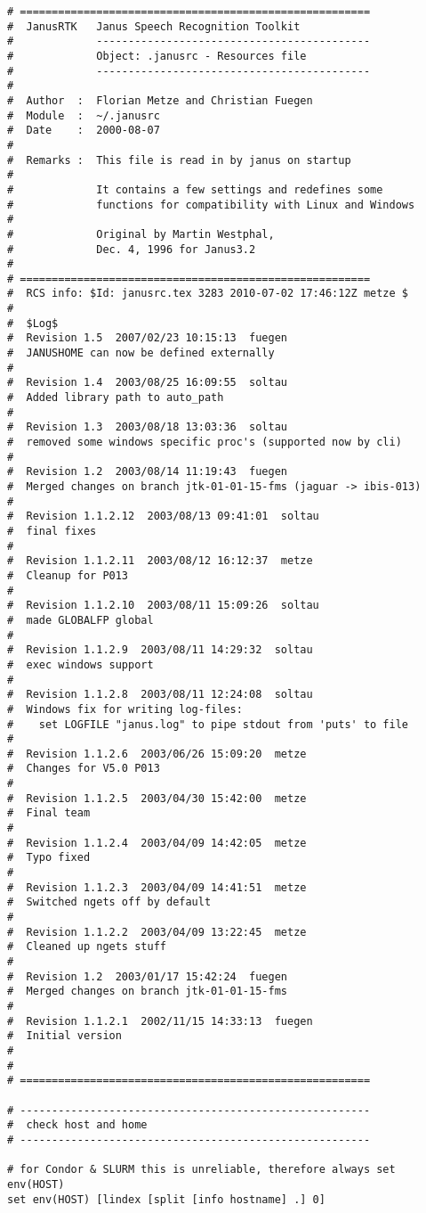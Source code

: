 {\small
\begin{verbatim}
# =======================================================
#  JanusRTK   Janus Speech Recognition Toolkit
#             -------------------------------------------
#             Object: .janusrc - Resources file
#             -------------------------------------------
#
#  Author  :  Florian Metze and Christian Fuegen
#  Module  :  ~/.janusrc
#  Date    :  2000-08-07
#
#  Remarks :  This file is read in by janus on startup
#
#             It contains a few settings and redefines some
#             functions for compatibility with Linux and Windows
#
#             Original by Martin Westphal,
#             Dec. 4, 1996 for Janus3.2
#
# =======================================================
#  RCS info: $Id: janusrc.tex 3283 2010-07-02 17:46:12Z metze $
# 
#  $Log$
#  Revision 1.5  2007/02/23 10:15:13  fuegen
#  JANUSHOME can now be defined externally
#
#  Revision 1.4  2003/08/25 16:09:55  soltau
#  Added library path to auto_path
#
#  Revision 1.3  2003/08/18 13:03:36  soltau
#  removed some windows specific proc's (supported now by cli)
#
#  Revision 1.2  2003/08/14 11:19:43  fuegen
#  Merged changes on branch jtk-01-01-15-fms (jaguar -> ibis-013)
#
#  Revision 1.1.2.12  2003/08/13 09:41:01  soltau
#  final fixes
#
#  Revision 1.1.2.11  2003/08/12 16:12:37  metze
#  Cleanup for P013
#
#  Revision 1.1.2.10  2003/08/11 15:09:26  soltau
#  made GLOBALFP global
#
#  Revision 1.1.2.9  2003/08/11 14:29:32  soltau
#  exec windows support
#
#  Revision 1.1.2.8  2003/08/11 12:24:08  soltau
#  Windows fix for writing log-files:
#    set LOGFILE "janus.log" to pipe stdout from 'puts' to file
#
#  Revision 1.1.2.6  2003/06/26 15:09:20  metze
#  Changes for V5.0 P013
#
#  Revision 1.1.2.5  2003/04/30 15:42:00  metze
#  Final team
#
#  Revision 1.1.2.4  2003/04/09 14:42:05  metze
#  Typo fixed
#
#  Revision 1.1.2.3  2003/04/09 14:41:51  metze
#  Switched ngets off by default
#
#  Revision 1.1.2.2  2003/04/09 13:22:45  metze
#  Cleaned up ngets stuff
#
#  Revision 1.2  2003/01/17 15:42:24  fuegen
#  Merged changes on branch jtk-01-01-15-fms
#
#  Revision 1.1.2.1  2002/11/15 14:33:13  fuegen
#  Initial version
#
#
# =======================================================

# -------------------------------------------------------
#  check host and home
# -------------------------------------------------------

# for Condor & SLURM this is unreliable, therefore always set env(HOST)
set env(HOST) [lindex [split [info hostname] .] 0]


\end{verbatim}}
